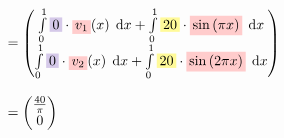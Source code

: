 \documentclass[
final,
a4paper,
oneside,
parskip=full,
headings=standardclasses,
headings=big,
pointednumbers,
fleqn
]{scrartcl}
\newcommand{\tfilly}[1]{\tfillc[#1][yellow!40]}
\newcommand{\tfillr}[1]{\tfillc[#1][red!20]}
\newcommand{\tfillv}[1]{\tfillc[#1][Violet!20]}
\newcommand*\difx{\; \mathop{}\!\mathrm{d}x}
\newcommand{\f}[2]{\frac{#1}{#2}}
\newcommand{\kl}[1]{{\left( #1 \right)}}
\begin{document}
{\begin{align*}
\begin{array}{ll}
            & \\
            & = \begin{pmatrix}
                \int\limits_{0}^{1}{\tfillv{$0$}       \cdot \tfillr{$v_1$}\kl{x} \difx} +
                \int\limits_{0}^{1}{\tfilly{$20$}      \cdot \tfillr{$\sin\kl{\pi x}$} \difx} \\
                \int\limits_{0}^{1}{\tfillv{$0$}       \cdot \tfillr{$v_2$}\kl{x} \difx} +
                \int\limits_{0}^{1}{\tfilly{$20$}      \cdot \tfillr{$\sin\kl{2 \pi x}$} \difx}
            \end{pmatrix} \\
            & \\
            & = \begin{pmatrix}
                \f{40}{\pi} \\
                0
            \end{pmatrix}
        \end{array}
    \end{align*}}
    
\end{document}
